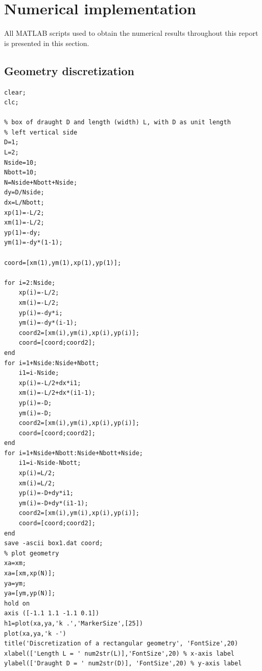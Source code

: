 \documentclass[a4paper,10pt]{article}
\begin{document}
\newpage
\section{Numerical implementation}
All MATLAB scripts used to obtain the numerical results throughout this report is presented in this section.
\subsection{Geometry discretization}
\begin{verbatim}
clear;
clc;

% box of draught D and length (width) L, with D as unit length
% left vertical side
D=1;
L=2;
Nside=10;
Nbott=10;
N=Nside+Nbott+Nside;
dy=D/Nside;
dx=L/Nbott;
xp(1)=-L/2;
xm(1)=-L/2;
yp(1)=-dy;
ym(1)=-dy*(1-1);

coord=[xm(1),ym(1),xp(1),yp(1)];

for i=2:Nside;
    xp(i)=-L/2;
    xm(i)=-L/2;
    yp(i)=-dy*i;
    ym(i)=-dy*(i-1);
    coord2=[xm(i),ym(i),xp(i),yp(i)];
    coord=[coord;coord2];
end
for i=1+Nside:Nside+Nbott;
    i1=i-Nside;
    xp(i)=-L/2+dx*i1;
    xm(i)=-L/2+dx*(i1-1);
    yp(i)=-D;
    ym(i)=-D;
    coord2=[xm(i),ym(i),xp(i),yp(i)];
    coord=[coord;coord2];
end
for i=1+Nside+Nbott:Nside+Nbott+Nside;
    i1=i-Nside-Nbott;
    xp(i)=L/2;
    xm(i)=L/2;
    yp(i)=-D+dy*i1;
    ym(i)=-D+dy*(i1-1);
    coord2=[xm(i),ym(i),xp(i),yp(i)];
    coord=[coord;coord2];
end
save -ascii box1.dat coord;
% plot geometry
xa=xm;
xa=[xm,xp(N)];
ya=ym;
ya=[ym,yp(N)];
hold on
axis ([-1.1 1.1 -1.1 0.1])
h1=plot(xa,ya,'k .','MarkerSize',[25])
plot(xa,ya,'k -')
title('Discretization of a rectangular geometry', 'FontSize',20)
xlabel(['Length L = ' num2str(L)],'FontSize',20) % x-axis label
ylabel(['Draught D = ' num2str(D)], 'FontSize',20) % y-axis label
\end{verbatim}
\end{document}
